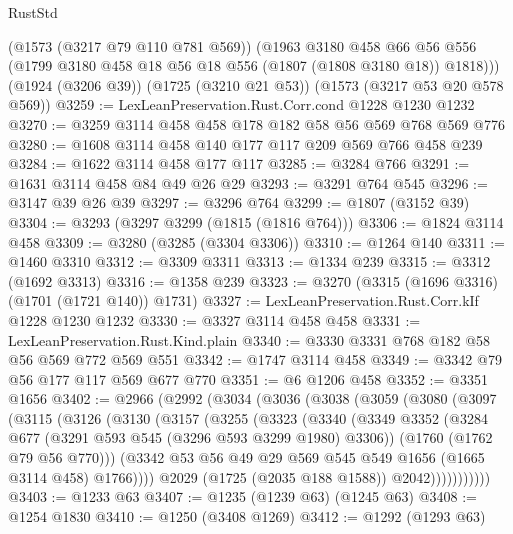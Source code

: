 \begin{lexlean}{RustStd}
\begin{coremodule}
{\begin{coremodule}
{{{{{{{{{{{{{      (@1573 (@3217 @79 @110 @781 @569))
      (@1963
        @3180
        @458
        @66
        @56
        @556
        (@1799 @3180 @458 @18 @56 @18 @556 (@1807 (@1808 @3180 @18)) @1818)))
    (@1924 (@3206 @39))
    (@1725 (@3210 @21 @53))
    (@1573 (@3217 @53 @20 @578 @569))
@3259 := LexLeanPreservation.Rust.Corr.cond @1228 @1230 @1232
@3270 := @3259 @3114 @458 @458 @178 @182 @58 @56 @569 @768 @569 @776
@3280 := @1608 @3114 @458 @140 @177 @117 @209 @569 @766 @458 @239
@3284 := @1622 @3114 @458 @177 @117
@3285 := @3284 @766
@3291 := @1631 @3114 @458 @84 @49 @26 @29
@3293 := @3291 @764 @545
@3296 := @3147 @39 @26 @39
@3297 := @3296 @764
@3299 := @1807 (@3152 @39)
@3304 := @3293 (@3297 @3299 (@1815 (@1816 @764)))
@3306 := @1824 @3114 @458
@3309 := @3280 (@3285 (@3304 @3306))
@3310 := @1264 @140
@3311 := @1460 @3310
@3312 := @3309 @3311
@3313 := @1334 @239
@3315 := @3312 (@1692 @3313)
@3316 := @1358 @239
@3323 := @3270 (@3315 (@1696 @3316) (@1701 (@1721 @140)) @1731)
@3327 := LexLeanPreservation.Rust.Corr.kIf @1228 @1230 @1232
@3330 := @3327 @3114 @458 @458
@3331 := LexLeanPreservation.Rust.Kind.plain
@3340 := @3330 @3331 @768 @182 @58 @56 @569 @772 @569 @551
@3342 := @1747 @3114 @458
@3349 := @3342 @79 @56 @177 @117 @569 @677 @770
@3351 := @6 @1206 @458
@3352 := @3351 @1656
@3402 := @2966
    (@2992
      (@3034
        (@3036
          (@3038
            (@3059
              (@3080
                (@3097
                  (@3115
                    (@3126
                      (@3130
                        (@3157
                          (@3255
                            (@3323
                              (@3340
                                (@3349
                                  @3352
                                  (@3284 @677 (@3291 @593 @545 (@3296 @593 @3299 @1980) @3306))
                                  (@1760 (@1762 @79 @56 @770)))
                                (@3342
                                  @53
                                  @56
                                  @49
                                  @29
                                  @569
                                  @545
                                  @549
                                  @1656
                                  (@1665 @3114 @458)
                                  @1766))))
                          @2029
                          (@1725 (@2035 @188 @1588))
                          @2042)))))))))))
@3403 := @1233 @63
@3407 := @1235 (@1239 @63) (@1245 @63)
@3408 := @1254 @1830
@3410 := @1250 (@3408 @1269)
@3412 := @1292 (@1293 @63)
}}}}}}}}}}}}}
\end{coremodule}}
\end{coremodule}
\end{lexlean}
